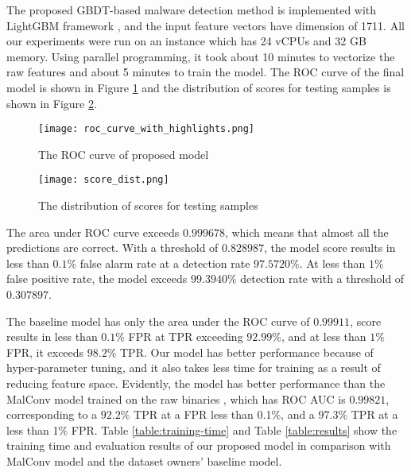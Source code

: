 The proposed GBDT-based malware detection method is implemented with LightGBM framework \cite{ke2017lightgbm}, and the input feature vectors have dimension of 1711. All our experiments were run on an instance which has 24 vCPUs and 32 GB memory. Using parallel programming, it took about 10 minutes to vectorize the raw features and about 5 minutes to train the model. The ROC curve of the final model is shown in Figure \ref{fig:roc_curve_with_highlights} and the distribution of scores for testing samples is shown in Figure \ref{fig:score_dist}.

\begin{figure}[ht]
\centering
\texttt{[image: roc\_curve\_with\_highlights.png]}
\caption{The ROC curve of proposed model}
\label{fig:roc_curve_with_highlights}
\end{figure}

\begin{figure}[ht] 
\centering
\texttt{[image: score\_dist.png]}
\caption{The distribution of scores for testing samples}
\label{fig:score_dist}
\end{figure}

The area under ROC curve exceeds $0.999678$, which means that almost all the predictions are correct. With a threshold of $0.828987$, the model score results in less than $0.1\%$ false alarm rate at a detection rate $97.5720\%$. At less than $1\%$ false positive rate, the model exceeds $99.3940\%$ detection rate with a threshold of $0.307897$. 

The baseline model has only the area under the ROC curve of $0.99911$, score results in less than $0.1\%$ FPR at TPR exceeding $92.99\%$, and at less than $1\%$ FPR, it exceeds $98.2\%$ TPR. Our model has better performance because of hyper-parameter tuning, and it also takes less time for training as a result of reducing feature space. Evidently, the model has better performance than the MalConv model trained on the raw binaries \cite{anderson2018ember}, which has ROC AUC is $0.99821$, corresponding to a $92.2\%$ TPR at a FPR less than 0.1\%, and a 97.3\% TPR at a less than 1\% FPR. Table \ref{table:training-time} and Table \ref{table:results} show the training time and evaluation results of our proposed model in comparison with MalConv model and the dataset owners’ baseline model.

